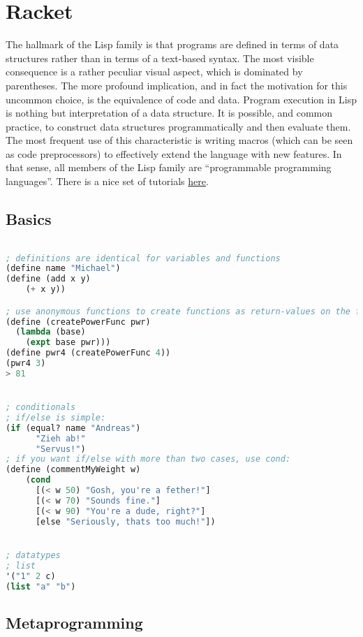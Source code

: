 \section{Racket}

The hallmark of the Lisp family is that programs are defined in terms of data structures rather than in terms of a text-based syntax. The most visible consequence is a rather peculiar visual aspect, which is dominated by parentheses. The more profound implication, and in fact the motivation for this uncommon choice, is the equivalence of code and data. Program execution in Lisp is nothing but interpretation of a data structure. It is possible, and common practice, to construct data structures programmatically and then evaluate them. The most frequent use of this characteristic is writing macros (which can be seen as code preprocessors) to effectively extend the language with new features. In that sense, all members of the Lisp family are “programmable programming languages”. 
There is a nice set of tutorials \href{https://beautifulracket.com/stacker/}{here}.

\subsection{Basics}
\begin{lstlisting}[language=lisp]

; definitions are identical for variables and functions
(define name "Michael")
(define (add x y)
    (+ x y))

; use anonymous functions to create functions as return-values on the fly
(define (createPowerFunc pwr)
  (lambda (base)
    (expt base pwr)))
(define pwr4 (createPowerFunc 4))
(pwr4 3)
> 81


; conditionals
; if/else is simple:
(if (equal? name "Andreas")
      "Zieh ab!"
      "Servus!")
; if you want if/else with more than two cases, use cond:
(define (commentMyWeight w)
    (cond
      [(< w 50) "Gosh, you're a fether!"]
      [(< w 70) "Sounds fine."]
      [(< w 90) "You're a dude, right?"]
      [else "Seriously, thats too much!"])


; datatypes
; list
'("1" 2 c)
(list "a" "b")


\end{lstlisting}

\subsection{Metaprogramming}


